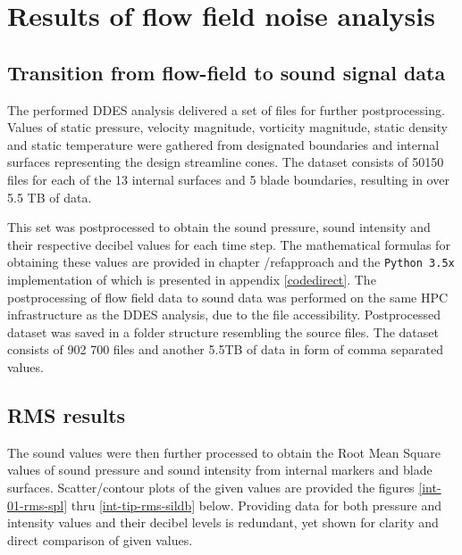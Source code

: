 
\chapter{Results of flow field noise analysis} %

\label{results} %



\section{Transition from flow-field to sound signal data}

The performed DDES analysis delivered a set of files for further postprocessing. Values of static pressure, velocity magnitude, vorticity magnitude, static density and static temperature were gathered from designated boundaries and internal surfaces representing the design streamline cones. The dataset consists of 50150 files for each of the 13 internal surfaces and 5 blade boundaries, resulting in over 5.5 TB of data.

This set was postprocessed to obtain the sound pressure, sound intensity and their respective decibel values for each time step. The mathematical formulas for obtaining these values are provided in chapter /ref{approach} and the \texttt{Python 3.5x} implementation of which is presented in appendix \ref{codedirect}. The postprocessing of flow field data to sound data was performed on the same HPC infrastructure as the DDES analysis, due to the file accessibility. Postprocessed dataset was saved in a folder structure resembling the source files. The dataset consists of 902 700 files and another 5.5TB of data in form of comma separated values.

\section{RMS results} \label{rmsresults}
The sound values were then further processed to obtain the Root Mean Square values of sound pressure and sound intensity from internal markers and blade surfaces. Scatter/contour plots of the given values are provided the figures \ref{int-01-rms-spl} thru \ref{int-tip-rms-sildb} below. Providing data for both pressure and intensity values and their decibel levels is redundant, yet shown for clarity and direct comparison of given values. 

